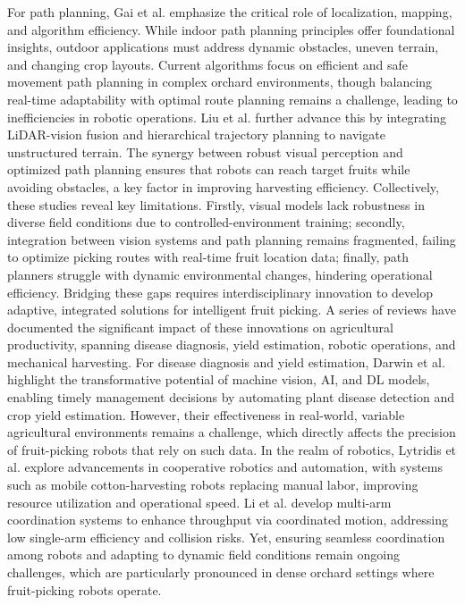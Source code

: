 \documentclass[a4paper,fleqn]{cas-dc}
\begin{document}
For path planning, Gai et al. \cite{gai2022fruit} emphasize the critical role of localization, mapping, and algorithm efficiency. While indoor path planning principles offer foundational insights, outdoor applications must address dynamic obstacles, uneven terrain, and changing crop layouts. Current algorithms focus on efficient and safe movement path planning in complex orchard environments, though balancing real-time adaptability with optimal route planning remains a challenge, leading to inefficiencies in robotic operations. Liu et al. \cite{liu2024hierarchical} further advance this by integrating LiDAR-vision fusion and hierarchical trajectory planning to navigate unstructured terrain. The synergy between robust visual perception and optimized path planning ensures that robots can reach target fruits while avoiding obstacles, a key factor in improving harvesting efficiency.
Collectively, these studies reveal key limitations. Firstly, visual models lack robustness in diverse field conditions due to controlled-environment training; secondly, integration between vision systems and path planning remains fragmented, failing to optimize picking routes with real-time fruit location data; finally, path planners struggle with dynamic environmental changes, hindering operational efficiency. Bridging these gaps requires interdisciplinary innovation to develop adaptive, integrated solutions for intelligent fruit picking.
A series of reviews have documented the significant impact of these innovations on agricultural productivity, spanning disease diagnosis, yield estimation, robotic operations, and mechanical harvesting. For disease diagnosis and yield estimation, Darwin et al. \cite{darwin2021recognition} highlight the transformative potential of machine vision, AI, and DL models, enabling timely management decisions by automating plant disease detection and crop yield estimation. However, their effectiveness in real-world, variable agricultural environments remains a challenge, which directly affects the precision of fruit-picking robots that rely on such data.
In the realm of robotics, Lytridis et al. \cite{lytridis2021overview} explore advancements in cooperative robotics and automation, with systems such as mobile cotton-harvesting robots replacing manual labor, improving resource utilization and operational speed. Li et al. \cite{li2023multi} develop multi-arm coordination systems to enhance throughput via coordinated motion, addressing low single-arm efficiency and collision risks. Yet, ensuring seamless coordination among robots and adapting to dynamic field conditions remain ongoing challenges, which are particularly pronounced in dense orchard settings where fruit-picking robots operate.
\end{document}
